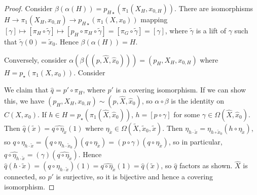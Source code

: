 \begin{proof}
	Consider \( \beta(\alpha(H)) = p_{H\star}(\pi_1(X_H,x_{0,H})) \).
	There are isomorphisms \( H \to \pi_1(X_H,x_{0,H}) \to p_{H\star}(\pi_1(X,x_0)) \) mapping \( [\gamma] \mapsto [\pi_H \circ \widetilde \gamma] \mapsto [p_H \circ \pi_H \circ \widetilde \gamma] = [\pi_G \circ \widetilde \gamma] = [\gamma] \), where \( \widetilde \gamma \) is a lift of \( \gamma \) such that \( \widetilde\gamma(0) = \widetilde x_0 \).
	Hence \( \beta(\alpha(H)) = H \).

	Conversely, consider \( \alpha(\beta((p, \hat X, \hat x_0))) = (p_H, X_H, x_{0,H}) \) where \( H = p_\star(\pi_1(X,x_0)) \).
	Consider
	\begin{center}
	\end{center}
	We claim that \( \hat q = p' \circ \pi_H \), where \( p' \) is a covering isomorphism.
	If we can show this, we have \( (p_H, X_H, x_{0,H}) \sim (p, \hat X, \hat x_0) \), so \( \alpha \circ \beta \) is the identity on \( C(X,x_0) \).
	If \( h \in H = p_\star(\pi_1(\hat X, \hat x_0)) \), \( h = [p \circ \gamma] \) for some \( \gamma \in \Omega(\hat X, \hat x_0) \).
	Then \( \hat q(\widetilde x) = \widehat{q \circ \eta_{\widetilde x}}(1) \) where \( \eta_{\widetilde x} \in \Omega(\widetilde X, \widetilde x_0, \widetilde x) \).
	Then \( \eta_{h \cdot \widetilde x} = \eta_{h \circ \widetilde x_0} (h \circ \eta_{\widetilde x}) \), so \( q \circ \eta_{h \cdot \widetilde x} = (q \circ \eta_{h \cdot \widetilde x_0})(q \circ \eta_{\widetilde x}) = (p \circ \gamma)(q \circ \eta_{\widetilde x}) \), so in particular, \( \widehat{q \circ \eta_{h \cdot \widetilde x}} = (\gamma)(\widehat{q \circ \eta_{\widetilde x}}) \).
	Hence \( \hat q(h \cdot \widetilde x) = (q \circ \eta_{h \cdot \widetilde x})(1) = \widehat{q \circ \eta_{\widetilde x}}(1) = \hat q(\widetilde x) \), so \( \hat q \) factors as shown.
	\( \hat X \) is connected, so \( p' \) is surjective, so it is bijective and hence a covering isomorphism.
\end{proof}
